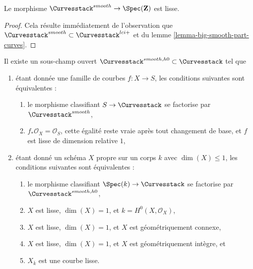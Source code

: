 \begin{lemma}
\label{lemma-smooth-curves-smooth}
Le morphisme $\Curvesstack^{smooth} \to \Spec(\mathbf{Z})$ est lisse.
\end{lemma}

\begin{proof}
Cela résulte immédiatement de l'observation que
$\Curvesstack^{smooth} \subset \Curvesstack^{lci+}$
et du lemme \ref{lemma-big-smooth-part-curves}.
\end{proof}

\begin{lemma}
\label{lemma-smooth-curves-h0}
Il existe un sous-champ ouvert
$\Curvesstack^{smooth, h0} \subset \Curvesstack$
tel que
\begin{enumerate}
\item étant donnée une famille de courbes $f : X \to S$, les conditions suivantes sont équivalentes :
\begin{enumerate}
\item le morphisme classifiant $S \to \Curvesstack$ se factorise
par $\Curvesstack^{smooth}$,
\item $f_*\mathcal{O}_X = \mathcal{O}_S$, cette égalité reste vraie après tout changement de base,
et $f$ est lisse de dimension relative $1$,
\end{enumerate}
\item étant donné un schéma $X$ propre sur un corps $k$ avec
$\dim(X) \leq 1$, les conditions suivantes sont équivalentes :
\begin{enumerate}
\item le morphisme classifiant $\Spec(k) \to \Curvesstack$ se factorise
par $\Curvesstack^{smooth, h0}$,
\item $X$ est lisse, $\dim(X) = 1$, et $k = H^0(X, \mathcal{O}_X)$,
\item $X$ est lisse, $\dim(X) = 1$, et $X$ est géométriquement connexe,
\item $X$ est lisse, $\dim(X) = 1$, et $X$ est géométriquement intègre, et
\item $X_{\overline{k}}$ est une courbe lisse.
\end{enumerate}
\end{enumerate}
\end{lemma}

